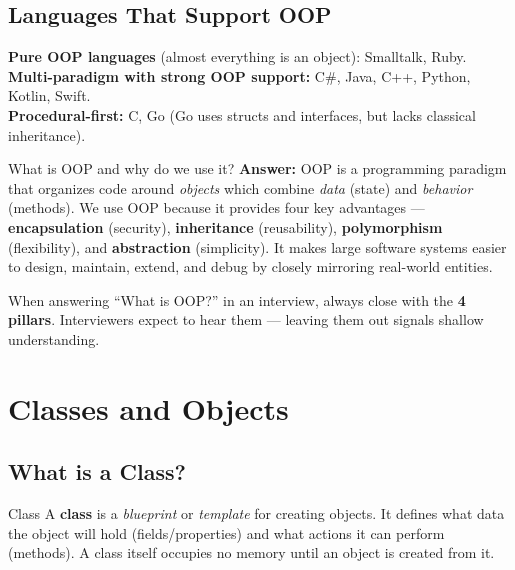 \documentclass[11pt,a4paper]{article}
\begin{document}
\subsection{Languages That Support OOP}

\textbf{Pure OOP languages} (almost everything is an object): Smalltalk, Ruby. \\
\textbf{Multi-paradigm with strong OOP support:} C\#, Java, C++, Python, Kotlin, Swift. \\
\textbf{Procedural-first:} C, Go (Go uses structs and interfaces, but lacks classical inheritance).

\begin{intqBox}{What is OOP and why do we use it?}
\textbf{Answer:} OOP is a programming paradigm that organizes code around \textit{objects} which combine \textit{data} (state) and \textit{behavior} (methods). We use OOP because it provides four key advantages — \textbf{encapsulation} (security), \textbf{inheritance} (reusability), \textbf{polymorphism} (flexibility), and \textbf{abstraction} (simplicity). It makes large software systems easier to design, maintain, extend, and debug by closely mirroring real-world entities.
\end{intqBox}

\begin{tipBox}
When answering ``What is OOP?'' in an interview, always close with the \textbf{4 pillars}. Interviewers expect to hear them — leaving them out signals shallow understanding.
\end{tipBox}

\clearpage
\section{Classes and Objects}

\subsection{What is a Class?}

\begin{defnBox}{Class}
A \textbf{class} is a \textit{blueprint} or \textit{template} for creating objects. It defines what data the object will hold (fields/properties) and what actions it can perform (methods). A class itself occupies no memory until an object is created from it.
\end{defnBox}
\end{document}
